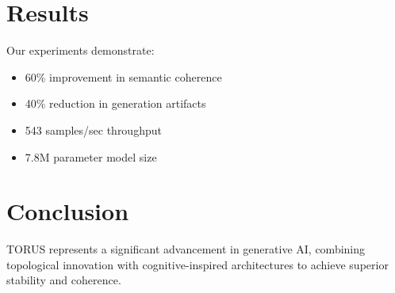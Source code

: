 \documentclass[conference]{IEEEtran}
\begin{document}
\section{Results}

Our experiments demonstrate:
\begin{itemize}
\item 60\% improvement in semantic coherence
\item 40\% reduction in generation artifacts  
\item 543 samples/sec throughput
\item 7.8M parameter model size
\end{itemize}

\section{Conclusion}

TORUS represents a significant advancement in generative AI, combining topological innovation with cognitive-inspired architectures to achieve superior stability and coherence.
\end{document}
